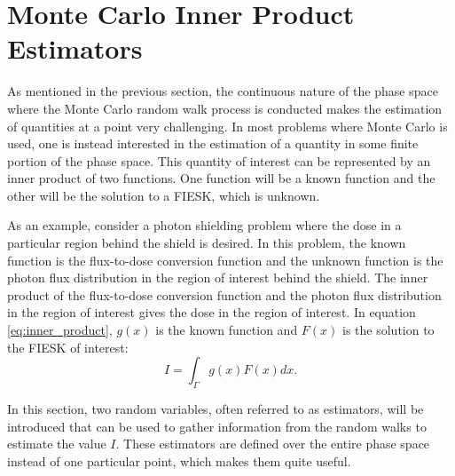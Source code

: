 \section{Monte Carlo Inner Product Estimators}
\label{sec:mc_int_eqn_estimators}
As mentioned in the previous section, the continuous nature of the phase space
where the Monte Carlo random walk process is conducted makes the estimation of
quantities at a point very challenging. In most problems where Monte Carlo is 
used, one is instead interested in the estimation of a quantity in some finite 
portion of the phase space. This quantity of interest can be represented by
an inner product of two functions. One function will be a known function and
the other will be the solution to a FIESK, which is unknown. 

As an example, consider a photon shielding problem where the dose in a 
particular region behind the shield is desired. In this problem, the known 
function is the flux-to-dose conversion function and the unknown function is 
the photon flux distribution in the region of interest behind the shield. The 
inner product of the flux-to-dose conversion function and the photon flux 
distribution in the region of interest gives the dose in the region of 
interest. In equation \ref{eq:inner_product}, $g(x)$ is the known function and 
$F(x)$ is the solution to the FIESK of interest:
\begin{equation}
  I = \int_{\Gamma} g(x)F(x)dx.
  \label{eq:inner_product}
\end{equation}

In this section, two random variables, often referred to as estimators, will 
be introduced that can be used to gather information from the random walks to 
estimate the value $I$. These estimators are defined over the entire phase 
space instead of one particular point, which makes them quite useful. 

